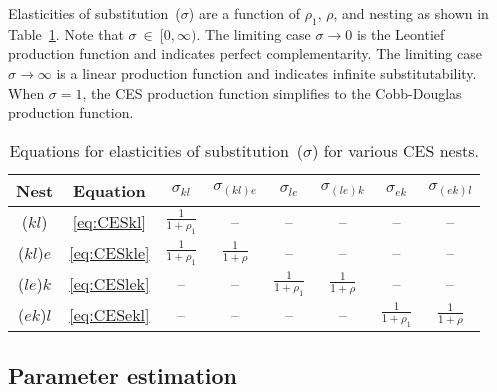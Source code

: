 \documentclass[preprint,10pt,3p]{elsarticle}\usepackage[]{graphicx}\usepackage[]{color}
\begin{document}
Elasticities of substitution~($\sigma$) are a function of $\rho_1$, $\rho$, and
nesting as shown in 
Table~\ref{tab:CES_sigma_equations}.
Note that $\sigma~\in~[0,\infty)$. 
The limiting case $\sigma \to 0$ is the Leontief production function and 
indicates perfect complementarity.  
The limiting case 
$\sigma \to \infty$ is a linear production function and 
indicates infinite substitutability.
When $\sigma = 1$, the CES production function simplifies to the
Cobb-Douglas production function.
%
\begin{table} \caption{Equations for elasticities of substitution~($\sigma$)
for various CES nests.}
\label{tab:CES_sigma_equations}
  \begin{center}
    \begin{tabular}{c c c c c c c c}
      \toprule
      Nest       & Equation
	  			 & $\sigma_{kl}$             & $\sigma_{(kl)e}$
	  			 & $\sigma_{le}$             & $\sigma_{(le)k}$
				 & $\sigma_{ek}$             & $\sigma_{(ek)l}$       \\
      \midrule
      ($kl$) \;  & \ref{eq:CESkl}
	  			 & $\frac{1}{1 + \rho_1}$   & --
	             & --                       & --
				 & --                       & --                    \\
      ($kl$)$e$  & \ref{eq:CESkle}
	  			 & $\frac{1}{1 + \rho_1}$   & $\frac{1}{1 + \rho}$
	             & --                       & --
				 & --                       & --                    \\
      ($le$)$k$  & \ref{eq:CESlek}
	  			 & --                       & --
	             & $\frac{1}{1 + \rho_1}$   & $\frac{1}{1 + \rho}$
				 & --                       & --                    \\
      ($ek$)$l$  & \ref{eq:CESekl}
	  			 & --                       & --
	             & --                       & --
	             & $\frac{1}{1 + \rho_1}$   & $\frac{1}{1 + \rho}$   \\
      \bottomrule
    \end{tabular}
  \end{center}
\end{table}



\subsection{Parameter estimation} 
\label{sec:parameter_estimation}
\end{document}

